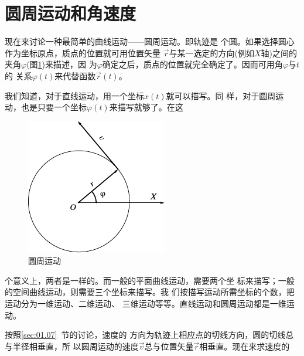 \section{圆周运动和角速度}\label{sec:01.09}

现在来讨论一种最简单的曲线运动——圆周运动。即轨迹是
个圆。如果选择圆心作为坐标原点，质点的位置就可用位置矢量
$\vec{r}$与某一选定的方向(例如$X$轴)之间的夹角$\varphi$(图\ref{fig:01.17})来描述，因
为$\varphi$确定之后，质点的位置就完全确定了。因而可用角$\varphi$与$t$的
关系$\varphi\left(t\right)$来代替函数$\vec{r}\left(t\right)$。

我们知道，对于直线运动，用一个坐标$x\left(t\right)$就可以描写。同
\clearpage
\noindent 样，对于圆周运动，也是只要一个坐标$\varphi\left(t\right)$来描写就够了。在这
\begin{figure}
  \centering \small
  \includegraphics{figure/fig01.17}
  \caption{圆周运动}
  \label{fig:01.17}
\end{figure}
个意义上，两者是一样的。而一般的平面曲线运动，需要两个坐
标来描写；一般的空间曲线运动，则需要三个坐标来描写。我
们按描写运动所需坐标的个数，把运动分为一维运动、二维运动、
三维运动等等。直线运动和圆周运动都是一维运动。

按照\ref{sec:01.07}~节的讨论，速度的
方向为轨迹上相应点的切线方向，圆的切线总与半径相垂直，所
以圆周运动的速度$\vec{v}$总与位置矢量$\vec{r}$相垂直。现在来求速度的

